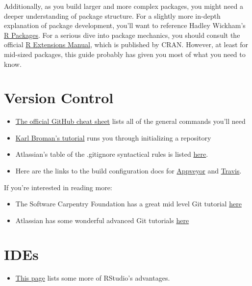 \documentclass[
]{book}
\providecommand{\tightlist}{%
  \setlength{\itemsep}{0pt}\setlength{\parskip}{0pt}}
\begin{document}
Additionally, as you build larger and more complex packages, you might need a deeper understanding of package structure. For a slightly more in-depth explanation of package development, you'll want to reference Hadley Wickham's \href{http://r-pkgs.had.co.nz/}{R Packages}. For a serious dive into package mechanics, you should consult the official \href{https://cran.r-project.org/doc/manuals/R-exts.html\#Creating-R-packages}{R Extensions Manual}, which is published by CRAN. However, at least for mid-sized packages, this guide probably has given you most of what you need to know.

\hypertarget{version-control-1}{%
\section{Version Control}\label{version-control-1}}

\begin{itemize}
\tightlist
\item
  \href{https://github.github.com/training-kit/downloads/github-git-cheat-sheet.pdf}{The official GitHub cheat sheet} lists all of the general commands you'll need
\item
  \href{http://kbroman.org/github_tutorial/pages/init.html}{Karl Broman's tutorial} runs you through initializing a repository
\item
  Atlassian's table of the .gitignore syntactical rules is listed \href{https://www.atlassian.com/git/tutorials/gitignore}{here}.
\item
  Here are the links to the build configuration docs for \href{https://www.appveyor.com/docs/build-configuration/}{Appveyor} and \href{https://docs.travis-ci.com/user/languages/r/}{Travis}.
\end{itemize}

If you're interested in reading more:

\begin{itemize}
\tightlist
\item
  The Software Carpentry Foundation has a great mid level Git tutorial \href{https://swcarpentry.GitHub.io/git-novice/}{here}
\item
  Atlassian has some wonderful advanced Git tutorials \href{https://www.atlassian.com/git/tutorials/advanced-overview}{here}
\end{itemize}

\hypertarget{ides}{%
\section{IDEs}\label{ides}}

\begin{itemize}
\tightlist
\item
  \href{https://www.theanalysisfactor.com/the-advantages-of-rstudio/}{This page} lists some more of RStudio's advantages.
\end{itemize}
\end{document}
